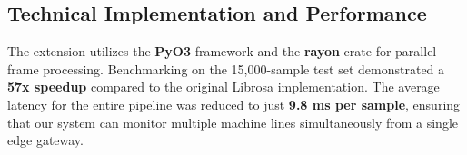 \subsection{Technical Implementation and Performance}
The extension utilizes the \textbf{PyO3} framework and the \textbf{rayon} crate for parallel frame processing. Benchmarking on the 15,000-sample test set demonstrated a \textbf{57x speedup} compared to the original Librosa implementation. The average latency for the entire pipeline was reduced to just \textbf{9.8 ms per sample}, ensuring that our system can monitor multiple machine lines simultaneously from a single edge gateway.
